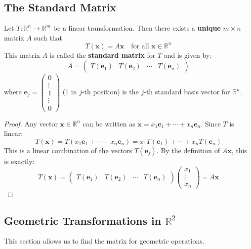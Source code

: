 \documentclass[oneside]{book}
\begin{document}
\subsection{The Standard Matrix}
\begin{theorem}
Let $T: \mathbb{R}^n \to \mathbb{R}^m$ be a linear transformation. Then there exists a \textbf{unique} $m \times n$ matrix $A$ such that
\[ T(\mathbf{x}) = A\mathbf{x} \quad \text{for all } \mathbf{x} \in \mathbb{R}^n \]
This matrix $A$ is called the \textbf{standard matrix} for $T$ and is given by:
\[ A = \begin{pmatrix} T(\mathbf{e}_1) & T(\mathbf{e}_2) & \cdots & T(\mathbf{e}_n) \end{pmatrix} \]
where $\mathbf{e}_j = \begin{pmatrix} 0 \\ \vdots \\ 1 \\ \vdots \\ 0 \end{pmatrix}$ (1 in $j$-th position) is the $j$-th standard basis vector for $\mathbb{R}^n$.
\end{theorem}
\begin{proof}
Any vector $\mathbf{x} \in \mathbb{R}^n$ can be written as $\mathbf{x} = x_1\mathbf{e}_1 + \cdots + x_n\mathbf{e}_n$.
Since $T$ is linear:
\[ T(\mathbf{x}) = T(x_1\mathbf{e}_1 + \cdots + x_n\mathbf{e}_n) = x_1T(\mathbf{e}_1) + \cdots + x_nT(\mathbf{e}_n) \]
This is a linear combination of the vectors $T(\mathbf{e}_j)$.
By the definition of $A\mathbf{x}$, this is exactly:
\[ T(\mathbf{x}) = \begin{pmatrix} T(\mathbf{e}_1) & T(\mathbf{e}_2) & \cdots & T(\mathbf{e}_n) \end{pmatrix} \begin{pmatrix} x_1 \\ \vdots \\ x_n \end{pmatrix} = A\mathbf{x} \]
\end{proof}

\subsection{Geometric Transformations in $\mathbb{R}^2$}
This section allows us to find the matrix for geometric operations.
\end{document}
